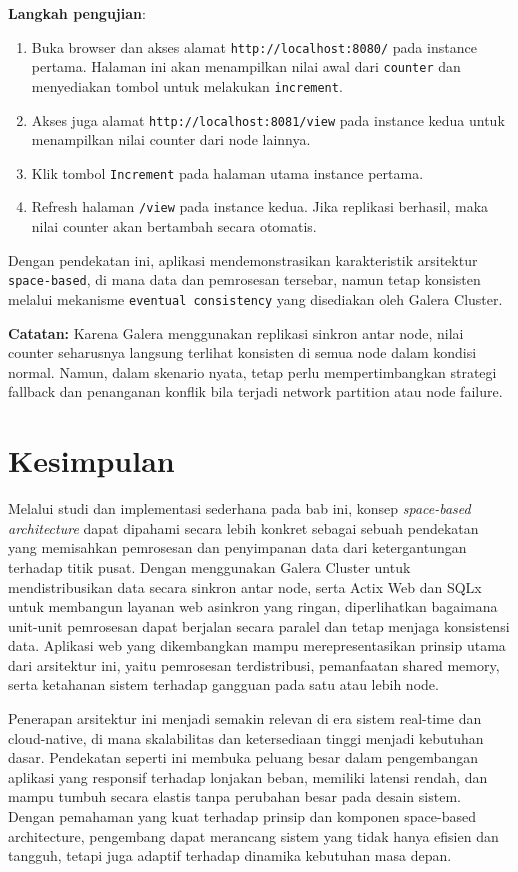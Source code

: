 \textbf{Langkah pengujian}:

\begin{enumerate}
	\item Buka browser dan akses alamat \texttt{http://localhost:8080/} pada instance pertama. Halaman ini akan menampilkan nilai awal dari \texttt{counter} dan menyediakan tombol untuk melakukan \texttt{increment}.
	\item Akses juga alamat \texttt{http://localhost:8081/view} pada instance kedua untuk menampilkan nilai counter dari node lainnya.
	\item Klik tombol \texttt{Increment} pada halaman utama instance pertama.
	\item Refresh halaman \texttt{/view} pada instance kedua. Jika replikasi berhasil, maka nilai counter akan bertambah secara otomatis.
\end{enumerate}

Dengan pendekatan ini, aplikasi mendemonstrasikan karakteristik arsitektur \texttt{space-based}, di mana data dan pemrosesan tersebar, namun tetap konsisten melalui mekanisme \texttt{eventual consistency} yang disediakan oleh Galera Cluster.

\textbf{Catatan:} Karena Galera menggunakan replikasi sinkron antar node, nilai counter seharusnya langsung terlihat konsisten di semua node dalam kondisi normal. Namun, dalam skenario nyata, tetap perlu mempertimbangkan strategi fallback dan penanganan konflik bila terjadi network partition atau node failure.


\section{Kesimpulan}

Melalui studi dan implementasi sederhana pada bab ini, konsep \textit{space-based architecture} dapat dipahami secara lebih konkret sebagai sebuah pendekatan yang memisahkan pemrosesan dan penyimpanan data dari ketergantungan terhadap titik pusat. Dengan menggunakan Galera Cluster untuk mendistribusikan data secara sinkron antar node, serta Actix Web dan SQLx untuk membangun layanan web asinkron yang ringan, diperlihatkan bagaimana unit-unit pemrosesan dapat berjalan secara paralel dan tetap menjaga konsistensi data. Aplikasi web yang dikembangkan mampu merepresentasikan prinsip utama dari arsitektur ini, yaitu pemrosesan terdistribusi, pemanfaatan shared memory, serta ketahanan sistem terhadap gangguan pada satu atau lebih node.

Penerapan arsitektur ini menjadi semakin relevan di era sistem real-time dan cloud-native, di mana skalabilitas dan ketersediaan tinggi menjadi kebutuhan dasar. Pendekatan seperti ini membuka peluang besar dalam pengembangan aplikasi yang responsif terhadap lonjakan beban, memiliki latensi rendah, dan mampu tumbuh secara elastis tanpa perubahan besar pada desain sistem. Dengan pemahaman yang kuat terhadap prinsip dan komponen space-based architecture, pengembang dapat merancang sistem yang tidak hanya efisien dan tangguh, tetapi juga adaptif terhadap dinamika kebutuhan masa depan.
